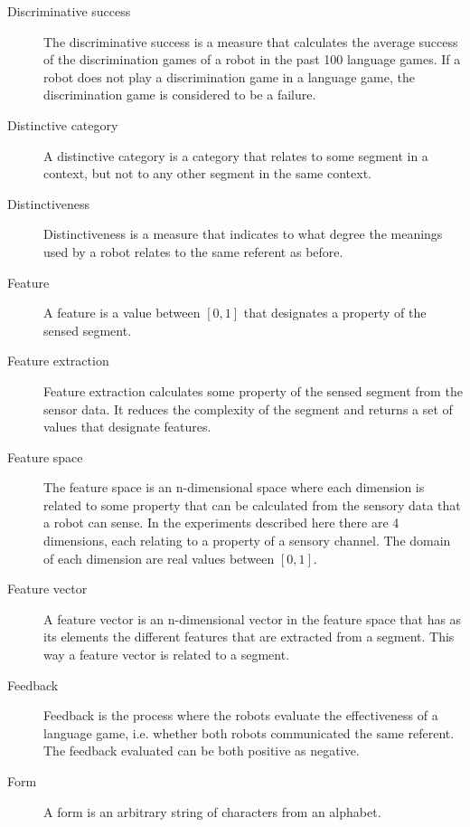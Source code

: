 \begin{description}
\item[Discriminative success] The discriminative success is a measure that calculates the average success of the discrimination games of a robot in the past 100 language games. If a robot does not play a discrimination game in a language game, the discrimination game is considered to be a failure.

\item[Distinctive category] A distinctive category is a category that relates to some segment in a context, but not to any other segment in the same context.

\item[Distinctiveness] Distinctiveness is a measure that indicates to what degree the meanings used by a robot relates to the same referent as before.

\item[Feature] A feature is a value between $[0,1]$ that designates a property of the sensed segment.

\item[Feature extraction] Feature extraction calculates some property of the sensed segment from the sensor data. It reduces the complexity of the segment and returns a set of values that designate features.

\item[Feature space] The feature space is an n-dimensional space where each dimension is related to some property that can be calculated from the sensory data that a robot can sense. In the experiments described here there are 4 dimensions, each relating to a property of a sensory channel. The domain of each dimension are real values between $[0,1]$.

\item[Feature vector] A feature vector is an n-dimensional vector in the feature space that has as its elements the different features that are extracted from a segment. This way a feature vector is related to a segment.

\item[Feedback] Feedback is the process where the robots evaluate the effectiveness of a language game, i.e. whether both robots communicated the same referent. The feedback evaluated can be both positive as negative.

\item[Form] A form is an arbitrary string of characters from an alphabet.


\end{description}
